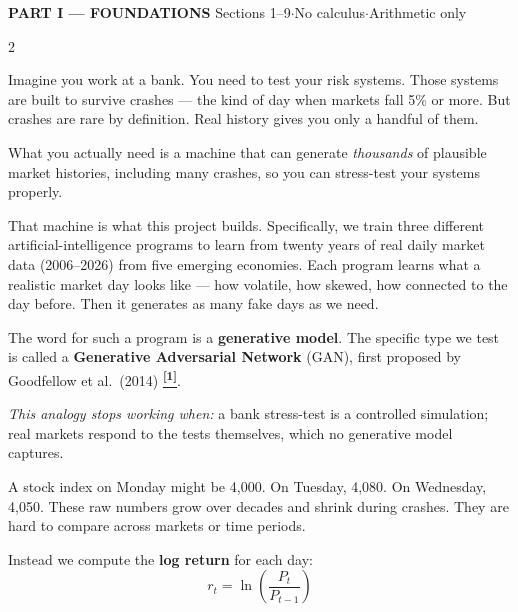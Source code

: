 \documentclass[10pt]{article}
\newcommand{\navybox}[2]{\begin{tcolorbox}[mybox={Navy}{LBg},title={#1}]#2\end{tcolorbox}}
\newcommand{\tcite}[1]{%
  \hyperlink{R:#1}{\textsuperscript{\scriptsize\textbf{[#1]}}}}
\begin{document}
\vspace{4pt}
\begin{tcolorbox}[enhanced,arc=0pt,outer arc=0pt,boxrule=0pt,
  colback=Navy!10,colframe=Navy!10,top=3pt,bottom=3pt,left=8pt,right=8pt]
{\large\bfseries\color{Navy} PART I --- FOUNDATIONS}
\hfill{\small\color{Navy!70} Sections 1--9\quad$\cdot$\quad No calculus\quad$\cdot$\quad Arithmetic only}
\end{tcolorbox}

\begin{multicols}{2}

\navybox{1\quad What We Are Trying to Build}{%
Imagine you work at a bank. You need to test your risk systems. Those systems are built to survive crashes --- the kind of day when markets fall 5\% or more. But crashes are rare by definition. Real history gives you only a handful of them.

What you actually need is a machine that can generate \emph{thousands} of plausible market histories, including many crashes, so you can stress-test your systems properly.

That machine is what this project builds. Specifically, we train three different artificial-intelligence programs to learn from twenty years of real daily market data (2006--2026) from five emerging economies. Each program learns what a realistic market day looks like --- how volatile, how skewed, how connected to the day before. Then it generates as many fake days as we need.

The word for such a program is a \textbf{generative model}. The specific type we test is called a \textbf{Generative Adversarial Network} (GAN), first proposed by Goodfellow et al.\ (2014)\tcite{1}.

\smallskip
\textit{This analogy stops working when:} a bank stress-test is a controlled simulation; real markets respond to the tests themselves, which no generative model captures.}

\columnbreak

\navybox{2\quad Prices, and Why We Study Changes}{%
A stock index on Monday might be 4{,}000. On Tuesday, 4{,}080. On Wednesday, 4{,}050. These raw numbers grow over decades and shrink during crashes. They are hard to compare across markets or time periods.

Instead we compute the \textbf{log return} for each day:
\begin{equation*}
  r_t = \ln\!\left(\frac{P_t}{P_{t-1}}\right)
\end{equation*}

}
\end{multicols}
\end{document}
